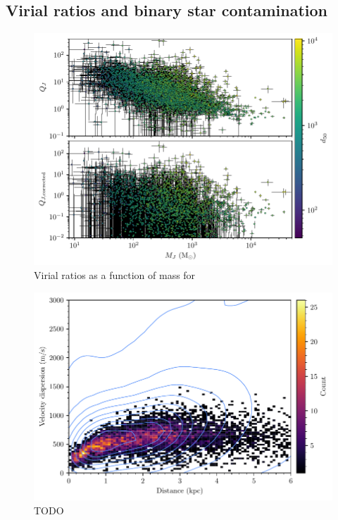 \subsection{Virial ratios and binary star contamination}
\label{sec:dynamics:results:virial}

\begin{figure}[t]
    \centering
    \includegraphics[width=\textwidth]{fig/c4/results_virial_vs_mass.pdf}
    \caption[TODO]{Virial ratios as a function of mass for }
    \label{fig:dynamics:results:virial_vs_mass}
 \end{figure}

 \begin{figure}[t]
    \centering
    \includegraphics[width=\textwidth]{fig/c4/dispersion_binaries.pdf}
    \caption[TODO]{TODO}
    \label{fig:dynamics:velocities:binary_contamination}
\end{figure}

